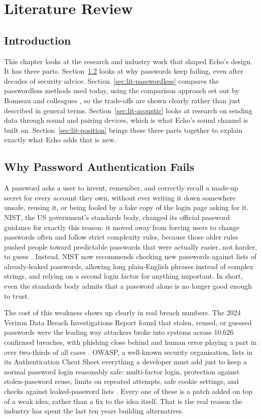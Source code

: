 \chapter{Literature Review}
\label{ch:literature}

\section{Introduction}

This chapter looks at the research and industry work that shaped Echo's
design. It has three parts. Section~\ref{sec:lit-password} looks at why
passwords keep failing, even after decades of security advice.
Section~\ref{sec:lit-passwordless} compares the passwordless methods used
today, using the comparison approach set out by Bonneau and colleagues
\cite{bonneau2012quest}, so the trade-offs are shown clearly rather than
just described in general terms. Section~\ref{sec:lit-acoustic} looks at
research on sending data through sound and pairing devices, which is what
Echo's sound channel is built on. Section~\ref{sec:lit-position} brings
these three parts together to explain exactly what Echo adds that is new.

\section{Why Password Authentication Fails}
\label{sec:lit-password}

A password asks a user to invent, remember, and correctly recall a made-up
secret for every account they own, without ever writing it down somewhere
unsafe, reusing it, or being fooled by a fake copy of the login page asking
for it. NIST, the US government's standards body, changed its official
password guidance for exactly this reason: it moved away from forcing
users to change passwords often and follow strict complexity rules,
because those older rules pushed people toward predictable passwords that
were actually easier, not harder, to guess \cite{nist80063b}. Instead,
NIST now recommends checking new passwords against lists of already-leaked
passwords, allowing long plain-English phrases instead of complex strings,
and relying on a second login factor for anything important. In short,
even the standards body admits that a password alone is no longer good
enough to trust.

The cost of this weakness shows up clearly in real breach numbers. The
2024 Verizon Data Breach Investigations Report found that stolen, reused,
or guessed passwords were the leading way attackers broke into systems
across 10,626 confirmed breaches, with phishing close behind and human
error playing a part in over two-thirds of all cases
\cite{verizon2024dbir}. OWASP, a well-known security organisation, lists
in its Authentication Cheat Sheet everything a developer must add just to
keep a normal password login reasonably safe: multi-factor login,
protection against stolen-password reuse, limits on repeated attempts, safe
cookie settings, and checks against leaked-password lists
\cite{owaspauthn}. Every one of these is a patch added on top of a weak
idea, rather than a fix to the idea itself. That is the real reason the
industry has spent the last ten years building alternatives.

